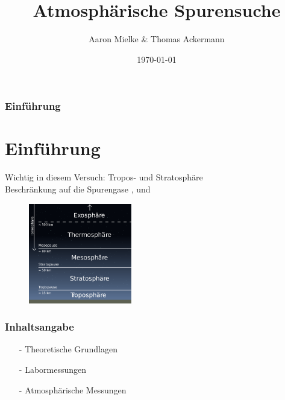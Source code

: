 \documentclass{beamer}
\title{Atmosphärische Spurensuche}
\author{Aaron Mielke \& Thomas Ackermann}
\date{\today}
\begin{document}
\maketitle


\begin{frame}
\frametitle{Einführung}
    \section{Einführung}
    Wichtig in diesem Versuch: Tropos- und Stratosphäre\\
    Beschränkung auf die Spurengase ,  und  
    \begin{figure}[h]
        \includegraphics[width=0.4\textwidth]{fig/photo/erdatmosphäre.png}
    \end{figure}
\end{frame}


\begin{frame}
    \frametitle{Inhaltsangabe}
    \begin{itemize}
        \item[-] Theoretische Grundlagen
    \vfill
\item[-] Labormessungen
    \vfill
\item[-] Atmosphärische Messungen 
\end{itemize}
\end{frame}


\end{document}
